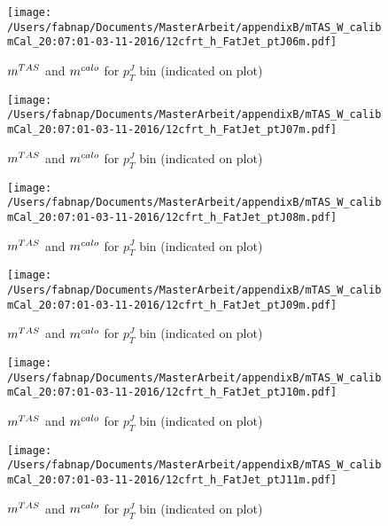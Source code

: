 \begin{figure}
 
\texttt{[image: /Users/fabnap/Documents/MasterArbeit/appendixB/mTAS\_W\_calibmCal\_20:07:01-03-11-2016/12cfrt\_h\_FatJet\_ptJ06m.pdf]}
\caption{$m^{TAS}$ and $m^{calo}$ for $p_{T}^{J}$ bin (indicated on plot) }
 
\end{figure}
\begin{figure}
 
\texttt{[image: /Users/fabnap/Documents/MasterArbeit/appendixB/mTAS\_W\_calibmCal\_20:07:01-03-11-2016/12cfrt\_h\_FatJet\_ptJ07m.pdf]}
\caption{$m^{TAS}$ and $m^{calo}$ for $p_{T}^{J}$ bin (indicated on plot) }
 
\end{figure}
 
\begin{figure}
 
\texttt{[image: /Users/fabnap/Documents/MasterArbeit/appendixB/mTAS\_W\_calibmCal\_20:07:01-03-11-2016/12cfrt\_h\_FatJet\_ptJ08m.pdf]}
\caption{$m^{TAS}$ and $m^{calo}$ for $p_{T}^{J}$ bin (indicated on plot) }
 
\end{figure}
 
\begin{figure}
 
\texttt{[image: /Users/fabnap/Documents/MasterArbeit/appendixB/mTAS\_W\_calibmCal\_20:07:01-03-11-2016/12cfrt\_h\_FatJet\_ptJ09m.pdf]}
\caption{$m^{TAS}$ and $m^{calo}$ for $p_{T}^{J}$ bin (indicated on plot) }
 
\end{figure}
 
\begin{figure}
 
\texttt{[image: /Users/fabnap/Documents/MasterArbeit/appendixB/mTAS\_W\_calibmCal\_20:07:01-03-11-2016/12cfrt\_h\_FatJet\_ptJ10m.pdf]}
\caption{$m^{TAS}$ and $m^{calo}$ for $p_{T}^{J}$ bin (indicated on plot) }
 
\end{figure}
 
\begin{figure}
 
\texttt{[image: /Users/fabnap/Documents/MasterArbeit/appendixB/mTAS\_W\_calibmCal\_20:07:01-03-11-2016/12cfrt\_h\_FatJet\_ptJ11m.pdf]}
\caption{$m^{TAS}$ and $m^{calo}$ for $p_{T}^{J}$ bin (indicated on plot) }
 
\end{figure}
 
